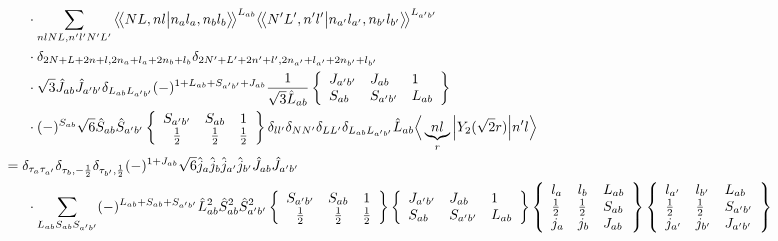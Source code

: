 \documentclass[master]{shnuthesis}
\newcommand{\llangle}{\big\langle\!\big\langle}
\newcommand{\rrangle}{\big\rangle\!\big\rangle}
\newcommand{\ap}{a^\prime}
\newcommand{\bp}{b^\prime}
\newcommand{\il}{\!\!\!\!\!\!\!\!\!\!}
\begin{document}
\begin{align}
    & \cdot \sum_{nlNL,n^\prime l^\prime N^\prime L^\prime} \llangle N L, n l \big| n_{a} l_{a}, n_{b} l_{b} \rrangle^{L_{ab}} \llangle N^\prime L^\prime, n^\prime l^\prime \big| n_{a^\prime} l_{a^\prime}, n_{b^\prime} l_{b^\prime} \rrangle^{L_{\ap\bp}} \notag\\
    & \cdot \delta_{2N+L+2n+l,2n_a+l_a+2n_b+l_b}\delta_{2N^\prime+L^\prime+2n^\prime+l^\prime,2n_{a^\prime}+l_{a^\prime}+2n_{b^\prime}+l_{b^\prime}}  \notag\\
    & \cdot \sqrt{3}\hat{J}_{ab}\hat{J}_{\ap\bp} \delta_{L_{ab}L_{\ap\bp}}(-)^{1+L_{ab}+S_{\ap\bp}+J_{ab}}\frac{1}{\sqrt{3}\hat{L}_{ab}}  \left\{\begin{array}{lll} J_{\ap\bp} & J_{ab} & 1 \\ S_{ab} & S_{\ap\bp} & L_{ab} \end{array}\right\}   \notag\\
    & \cdot (-)^{S_{ab}}\sqrt{6}\hat{S}_{ab}\hat{S}_{\ap\bp}  \left\{\begin{array}{ccc} S_{\ap\bp} & S_{ab} & 1 \\ \frac{1}{2} & \frac{1}{2} & \frac{1}{2} \end{array}\right\} \delta_{ll^\prime}\delta_{NN^\prime}\delta_{LL^\prime}\delta_{L_{ab}L_{\ap\bp}}  \hat{L}_{ab} \Big\langle \underbrace{n l}_{r} \Big| Y_2(\sqrt{2}r) \Big| n^\prime l \Big\rangle \\
    &\il = \delta_{\tau_a \tau_{\ap}}\delta_{\tau_b, -\frac{1}{2}}\delta_{\tau_{\bp}, \frac{1}{2}} (-)^{1+J_{ab}}\sqrt{6}\hat{j}_a\hat{j}_b\hat{j}_{\ap}\hat{j}_{\bp}\hat{J}_{ab}\hat{J}_{\ap\bp}  \notag\\
    & \cdot \sum_{L_{ab}S_{ab}S_{\ap\bp}} (-)^{L_{ab}+S_{ab}+S_{\ap\bp}} \hat{L}_{ab}^2\hat{S}_{ab}^2\hat{S}_{\ap\bp}^2  \left\{\begin{array}{ccc} S_{\ap\bp} & S_{ab} & 1 \\ \frac{1}{2} & \frac{1}{2} & \frac{1}{2} \end{array}\right\}  \left\{\begin{array}{lll} J_{\ap\bp} & J_{ab} & 1 \\ S_{ab} & S_{\ap\bp} & L_{ab} \end{array}\right\}  \left\{\begin{array}{lll}l_{a} & l_{b} & L_{ab} \\ \frac{1}{2} & \frac{1}{2} & S_{ab} \\j_{a} & j_{b} & J_{ab} \end{array}\right\} \left\{\begin{array}{lll} l_{\ap} & l_{\bp} & L_{ab} \\ \frac{1}{2} & \frac{1}{2} & S_{\ap\bp} \\j_{\ap} & j_{\bp} & J_{\ap\bp} \end{array}\right\}  \notag \\

\end{align}
\end{document}
